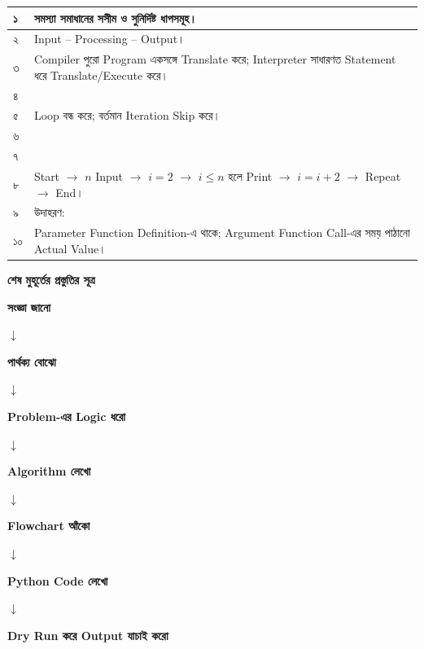 \begin{longtable}{
|C{0.08\textwidth}
|L{0.84\textwidth}|
}

\endfirsthead

\endhead

১
&
সমস্যা সমাধানের সসীম ও সুনির্দিষ্ট ধাপসমূহ।
\\
\hline

২
&
Input -- Processing -- Output।
\\
\hline

৩
&
Compiler পুরো Program একসঙ্গে Translate করে; Interpreter সাধারণত Statement ধরে Translate/Execute করে।
\\
\hline

৪
&
\\
\hline

৫
&
 Loop বন্ধ করে;  বর্তমান Iteration Skip করে।
\\
\hline

৬
&
\\
\hline

৭
&
\\
\hline

৮
&
Start
\(\rightarrow\)
\(n\) Input
\(\rightarrow\)
\(i=2\)
\(\rightarrow\)
\(i\le n\) হলে Print
\(\rightarrow\)
\(i=i+2\)
\(\rightarrow\)
Repeat
\(\rightarrow\)
End।
\\
\hline

৯
&
উদাহরণ:
\\
\hline

১০
&
Parameter Function Definition-এ থাকে; Argument Function Call-এর সময় পাঠানো Actual Value।
\\
\hline

\end{longtable}

\begin{rememberbox}

\textbf{\color{deepOrange}শেষ মুহূর্তের প্রস্তুতির সূত্র}

\begin{center}

\textbf{সংজ্ঞা জানো}

\(\downarrow\)

\textbf{পার্থক্য বোঝো}

\(\downarrow\)

\textbf{Problem-এর Logic ধরো}

\(\downarrow\)

\textbf{Algorithm লেখো}

\(\downarrow\)

\textbf{Flowchart আঁকো}

\(\downarrow\)

\textbf{Python Code লেখো}

\(\downarrow\)

\textbf{Dry Run করে Output যাচাই করো}

\end{center}

\end{rememberbox}

\small

